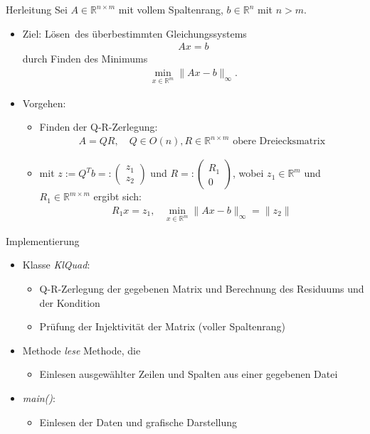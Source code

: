 \documentclass{beamer}
\begin{document}
\begin{frame}{Herleitung}
  Sei $A\in \mathbb{R}^{n\times m}$ mit vollem Spaltenrang,  $b\in \mathbb{R}^n$ mit $n>m$.\\
  \begin{itemize}
  \item Ziel: \glqq Lösen\grqq ~des überbestimmten Gleichungssystems 
  \begin{align}
  Ax=b
  \end{align}
  durch Finden des Minimums
  \begin{align}
  \min\limits_{x\in\mathbb{R}^m}\|Ax-b\|_\infty.
  \end{align}\pause
\item Vorgehen:
\begin{itemize}
\item Finden der Q-R-Zerlegung:
\begin{align}
A=QR, \text{~~~}Q\in  O(n), R\in \mathbb{R}^{n\times m}\text{ obere Dreiecksmatrix}
\end{align}\pause
\item mit $z:=Q^Tb=:
\begin{pmatrix}
z_1\\
\hline
z_2
\end{pmatrix}$ und $R=:\begin{pmatrix}
R_1\\
0
\end{pmatrix}$, wobei $z_1\in\mathbb{R}^{m}$ und $R_1\in\mathbb{R}^{m\times m}$ ergibt sich:
\begin{align}
R_1x=z_1\text{,~~~}  \min\limits_{x\in\mathbb{R}^m}\|Ax-b\|_\infty=\|z_2\|
\end{align}

\end{itemize}
  \end{itemize}
  
\end{frame}

 \begin{frame}{Implementierung}
 	\begin{itemize}
  	\item Klasse \textit{KlQuad}:
  	\begin{itemize}
  		\item Q-R-Zerlegung der gegebenen Matrix und Berechnung des Residuums und der Kondition
  		\item Prüfung der Injektivität der Matrix (voller Spaltenrang)
  	\end{itemize}
  	\pause
  	\item Methode \textit{lese} Methode, die 
  	  	\begin{itemize}
  		\item Einlesen ausgewählter Zeilen und Spalten aus einer gegebenen Datei
  	\end{itemize}
  	\pause
  	\item \textit{main()}:
  	  	\begin{itemize}
  		\item Einlesen der Daten und grafische Darstellung
  	\end{itemize}
  	\end{itemize}
 \end{frame}
\end{document}
